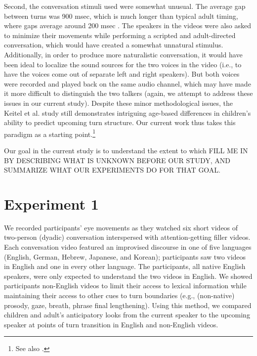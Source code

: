 \documentclass[authoryear, 12pt]{elsarticle}
\begin{document}
Second, the conversation stimuli \citet{keitel2013} used were somewhat unusual. The average gap between turns was 900 msec, which is much longer than typical adult timing, where gaps average around 200 msec \citep{stivers2009}. The speakers in the videos were also asked to minimize their movements while performing a scripted and adult-directed conversation, which would have created a somewhat unnatural stimulus. Additionally, in order to produce more naturalistic conversation, it would have been ideal to localize the sound sources for the two voices in the video (i.e., to have the voices come out of separate left and right speakers). But both voices were recorded and played back on the same audio channel, which may have made it more difficult to distinguish the two talkers (again, we attempt to address these issues in our current study). Despite these minor methodological issues, the Keitel et al. \citeyearpar{keitel2013} study still demonstrates intriguing age-based differences in children's ability to predict upcoming turn structure. Our current work thus takes this paradigm as a starting point.\footnote{See also \citet{casillas2012, casillas2013}.} 

Our goal in the current study is to understand the extent to which FILL ME IN BY DESCRIBING WHAT IS UNKNOWN BEFORE OUR STUDY, AND SUMMARIZE WHAT OUR EXPERIMENTS DO FOR THAT GOAL.




\section{Experiment 1}
\label{sec:exp1}

We recorded participants' eye movements as they watched six short videos of two-person (dyadic) conversation interspersed with attention-getting filler videos. Each conversation video featured an improvised discourse in one of five languages (English, German, Hebrew, Japanese, and Korean); participants saw two videos in English and one in every other language. The participants, all native English speakers, were only expected to understand the two videos in English. We showed participants non-English videos to limit their access to lexical information while maintaining their access to other cues to turn boundaries (e.g., (non-native) prosody, gaze, breath, phrase final lengthening). Using this method, we compared children and adult's anticipatory looks from the current speaker to the upcoming speaker at points of turn transition in English and non-English videos.
\end{document}
